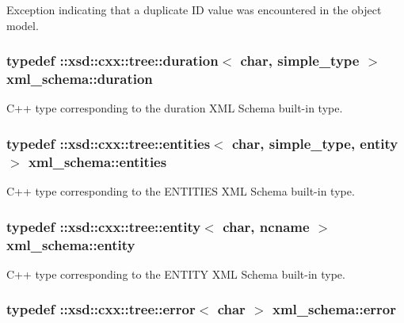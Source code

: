 Exception indicating that a duplicate I\-D value was encountered in the object model. 

\hypertarget{namespacexml__schema_acd79b4620c053b211a2e739daed3b2bf}{
\subsubsection[{duration}]{\setlength{\rightskip}{0pt plus 5cm}typedef \-::xsd\-::cxx\-::tree\-::duration$<$ char, {\bf simple\-\_\-type} $>$ {\bf xml\-\_\-schema\-::duration}}}\label{namespacexml__schema_acd79b4620c053b211a2e739daed3b2bf}


C++ type corresponding to the duration X\-M\-L Schema built-\/in type. 

\hypertarget{namespacexml__schema_ad9a0d0d60ff45d5f4a4086a502b9599b}{
\subsubsection[{entities}]{\setlength{\rightskip}{0pt plus 5cm}typedef \-::xsd\-::cxx\-::tree\-::entities$<$ char, {\bf simple\-\_\-type}, {\bf entity} $>$ {\bf xml\-\_\-schema\-::entities}}}\label{namespacexml__schema_ad9a0d0d60ff45d5f4a4086a502b9599b}


C++ type corresponding to the E\-N\-T\-I\-T\-I\-E\-S X\-M\-L Schema built-\/in type. 

\hypertarget{namespacexml__schema_a871d3ae7ead81c6fc7ff7d37cd5f4c8f}{
\subsubsection[{entity}]{\setlength{\rightskip}{0pt plus 5cm}typedef \-::xsd\-::cxx\-::tree\-::entity$<$ char, {\bf ncname} $>$ {\bf xml\-\_\-schema\-::entity}}}\label{namespacexml__schema_a871d3ae7ead81c6fc7ff7d37cd5f4c8f}


C++ type corresponding to the E\-N\-T\-I\-T\-Y X\-M\-L Schema built-\/in type. 

\hypertarget{namespacexml__schema_a13e2122658f2abee3c2da9829f2de129}{
\subsubsection[{error}]{\setlength{\rightskip}{0pt plus 5cm}typedef \-::xsd\-::cxx\-::tree\-::error$<$ char $>$ {\bf xml\-\_\-schema\-::error}}}\label{namespacexml__schema_a13e2122658f2abee3c2da9829f2de129}


